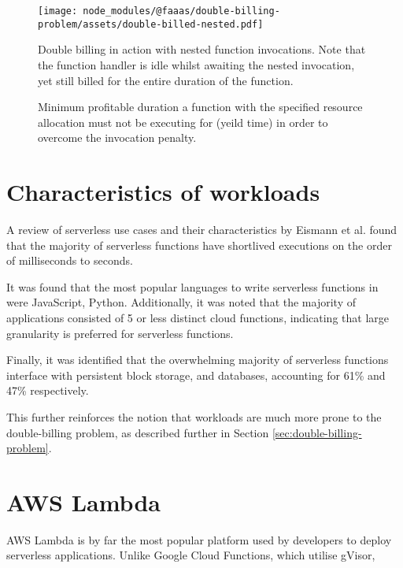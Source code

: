 \begin{figure}[t]
    \texttt{[image: node\_modules/@faaas/double-billing-problem/assets/double-billed-nested.pdf]}
    \caption{Double billing in action with nested function invocations. Note that the function handler is idle whilst awaiting the nested invocation, yet still billed for the entire duration of the function.}
    \label{fig:double-billing-nested}
\end{figure}

\begin{figure*}[t]
    \begin{center}
        
    \end{center}
    \caption{Minimum profitable duration a \faas{} function with the specified resource allocation must not be executing for (yeild time) in order to overcome the invocation penalty.}
\end{figure*}

\section{Characteristics of \faas{} workloads}
A review of serverless use cases and their characteristics by Eismann et al.\cite{eismannReviewServerlessUse2020} found that the majority of serverless functions have shortlived executions on the order of milliseconds to seconds.

It was found that the most popular languages to write serverless functions in were JavaScript, Python. Additionally, it was noted that the majority of applications consisted of 5 or less distinct cloud functions, indicating that large granularity is preferred for serverless functions.

Finally, it was identified that the overwhelming majority of serverless functions interface with persistent block storage, and databases, accounting for 61\% and 47\% respectively.

This further reinforces the notion that \faas{} workloads are much more prone to the double-billing problem, as described further in Section \ref{sec:double-billing-problem}.

\section{AWS Lambda}
AWS Lambda is by far the most popular\cite{eismannReviewServerlessUse2020,StateServerlessDatadog} \faas{} platform used by developers to deploy serverless applications. Unlike Google Cloud Functions, which utilise gVisor\cite{GVisor},

